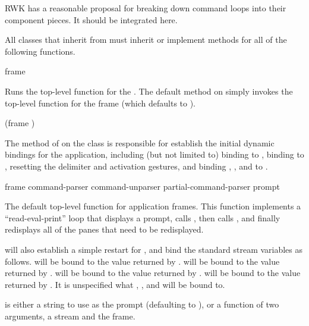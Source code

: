  {RWK has a reasonable proposal for breaking down command loops into
their component pieces.  It should be integrated here.}

All classes that inherit from  must inherit or implement
methods for all of the following functions.


 {frame}

Runs the top-level function for the  .  The default
method on  simply invokes the top-level function for the
frame (which defaults to ).

 {(frame )}

The  method of  on the
 class is responsible for establish the initial dynamic
bindings for the application, including (but not limited to) binding
 to , binding  to
, resetting the delimiter and activation gestures, and binding
, , and
 to .


 {frame \key command-parser command-unparser 
                                                  partial-command-parser
                                                  prompt}

The default top-level function for application frames.  This function implements
a ``read-eval-print'' loop that displays a prompt, calls
, then calls , and finally
redisplays all of the panes that need to be redisplayed.

 will also establish a simple restart for
, and bind the standard stream variables as follows.
 will be bound to the value returned by
.   will be bound to the value
returned by .   will be bound to the
value returned by .   will be bound to the
value returned by .  It is unspecified what
, , and  will be bound to.

 is either a string to use as the prompt (defaulting to
), or a function of two arguments, a stream and the frame.

